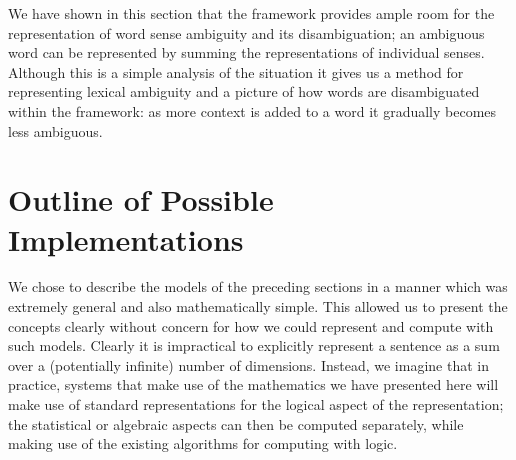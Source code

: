 We have shown in this section that the framework provides ample room for the representation of word sense ambiguity and its disambiguation; an ambiguous word can be represented by summing the representations of individual senses. Although this is a simple analysis of the situation it gives us a method for representing lexical ambiguity and a picture of how words are disambiguated within the framework: as more context is added to a word it gradually becomes less ambiguous.




\section{Outline of Possible Implementations}
\label{practical-issues}

We chose to describe the models of the preceding sections in a manner which was extremely general and also mathematically simple. This allowed us to present the concepts clearly without concern for how we could represent and compute with such models. Clearly it is impractical to explicitly represent a sentence as a sum over a (potentially infinite) number of dimensions. Instead, we imagine that in practice, systems that make use of the mathematics we have presented here will make use of standard representations for the logical aspect of the representation; the statistical or algebraic aspects can then be computed separately, while making use of the existing algorithms for computing with logic.

